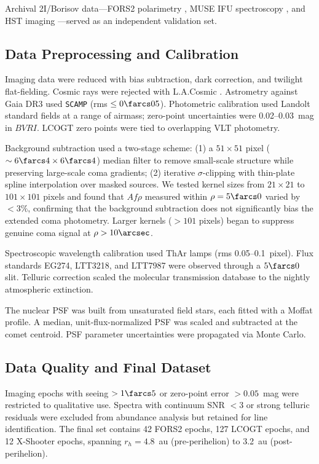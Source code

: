 \documentclass[preprint2]{aastex631}
\begin{document}
Archival 2I/Borisov data---FORS2 polarimetry \citep{bagnulo22}, MUSE IFU spectroscopy \citep{opitom20}, and HST imaging \citep{jewitt20}---served as an independent validation set.

\subsection{Data Preprocessing and Calibration}

Imaging data were reduced with bias subtraction, dark correction, and twilight flat-fielding. Cosmic rays were rejected with L.A.Cosmic \citep{vandokkum01}. Astrometry against Gaia DR3 used \texttt{SCAMP} \citep{bertin06} (rms $\leq 0\farcs05$). Photometric calibration used Landolt standard fields at a range of airmass; zero-point uncertainties were 0.02--0.03~mag in $BVRI$. LCOGT zero points were tied to overlapping VLT photometry.

Background subtraction used a two-stage scheme: (1) a $51 \times 51$ pixel ($\sim 6\farcs4 \times 6\farcs4$) median filter to remove small-scale structure while preserving large-scale coma gradients; (2) iterative $\sigma$-clipping with thin-plate spline interpolation over masked sources. We tested kernel sizes from $21 \times 21$ to $101 \times 101$ pixels and found that $Af\rho$ measured within $\rho = 5\farcs0$ varied by $< 3\%$, confirming that the background subtraction does not significantly bias the extended coma photometry. Larger kernels ($> 101$ pixels) began to suppress genuine coma signal at $\rho > 10\arcsec$.

Spectroscopic wavelength calibration used ThAr lamps (rms 0.05--0.1~pixel). Flux standards EG274, LTT3218, and LTT7987 were observed through a $5\farcs0$ slit. Telluric correction scaled the molecular transmission database \citep{moehler14} to the nightly atmospheric extinction.

The nuclear PSF was built from unsaturated field stars, each fitted with a Moffat profile. A median, unit-flux-normalized PSF was scaled and subtracted at the comet centroid. PSF parameter uncertainties were propagated via Monte Carlo.

\subsection{Data Quality and Final Dataset}

Imaging epochs with seeing $>1\farcs5$ or zero-point error $>0.05$~mag were restricted to qualitative use. Spectra with continuum SNR $<3$ or strong telluric residuals were excluded from abundance analysis but retained for line identification. The final set contains 42 FORS2 epochs, 127 LCOGT epochs, and 12 X-Shooter epochs, spanning $r_h = 4.8$~au (pre-perihelion) to 3.2~au (post-perihelion).
\end{document}
